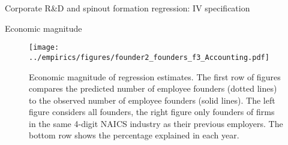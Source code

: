 \documentclass[english,usenames,dvipsnames]{beamer}
\begin{document}
\begin{frame}{Corporate R\&D and spinout formation regression: IV specification}
\begin{table}
	\Tiny
	\centering
	
	\caption{\tiny The dependent variable is the log of the average yearly number of founders from the parent firm joining startups, over the years $t+1,t+2,t+3$. Independent variables are similarly averaged over $t,t-1,t-2$. Columns (1) and (5) are estimated by OLS. The remaining columns columns are estimated by instrumenting R\&D spending using firm-specific tax incentives for R\&D, from Bloom 2013. Standard errors are clustered at the firm level.}
	\label{table:RDandSpinoutFormation_iv_founder2_l3f3}
\end{table}
\end{frame}


\begin{frame}{Economic magnitude}
\begin{figure}[!htb]
	\texttt{[image: ../empirics/figures/founder2\_founders\_f3\_Accounting.pdf]}
	\caption{\tiny Economic magnitude of regression estimates. The first row of figures compares the predicted number of employee founders (dotted lines) to the observed number of employee founders (solid lines). The left figure considers all founders, the right figure only founders of firms in the same 4-digit NAICS industry as their previous employers. The bottom row shows the percentage explained in each year.}
\end{figure}
\end{frame}
\end{document}
